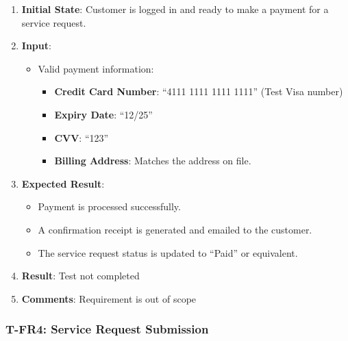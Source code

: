 \documentclass[12pt, titlepage]{article}
\begin{document}
\begin{enumerate}
    \item \textbf{Initial State}: Customer is logged in and ready to make a payment for a service request.
    \item \textbf{Input}:
    \begin{itemize}
        \item Valid payment information:
        \begin{itemize}
            \item \textbf{Credit Card Number}: ``4111 1111 1111 1111'' (Test Visa number)
            \item \textbf{Expiry Date}: ``12/25''
            \item \textbf{CVV}: ``123''
            \item \textbf{Billing Address}: Matches the address on file.
        \end{itemize}
    \end{itemize}
        \item \textbf{Expected Result}:
        \begin{itemize}
            \item Payment is processed successfully.
            \item A confirmation receipt is generated and emailed to the customer.
            \item The service request status is updated to ``Paid'' or equivalent.
        \end{itemize}
        \item \textbf{Result}: Test not completed
        \item \textbf{Comments}: Requirement is out of scope
\end{enumerate}

\subsubsection*{T-FR4: Service Request Submission}
\end{document}
